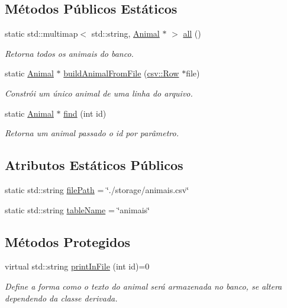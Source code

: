 \subsection*{Métodos Públicos Estáticos}
\begin{DoxyCompactItemize}
\item 
static std\+::multimap$<$ std\+::string, \hyperlink{classAnimal}{Animal} $\ast$ $>$ \hyperlink{classAnimal_a342dd3f74afeeadd169e792db6f04845}{all} ()
\begin{DoxyCompactList}\small\item\em Retorna todos os animais do banco. \end{DoxyCompactList}\item 
static \hyperlink{classAnimal}{Animal} $\ast$ \hyperlink{classAnimal_a8b0e3217c72fa8de0316828c6385dd99}{build\+Animal\+From\+File} (\hyperlink{classcsv_1_1Row}{csv\+::\+Row} $\ast$file)
\begin{DoxyCompactList}\small\item\em Constrói um único animal de uma linha do arquivo. \end{DoxyCompactList}\item 
static \hyperlink{classAnimal}{Animal} $\ast$ \hyperlink{classAnimal_aac52a938d9c55280467c9f6e9564df95}{find} (int id)
\begin{DoxyCompactList}\small\item\em Retorna um animal passado o id por parâmetro. \end{DoxyCompactList}\end{DoxyCompactItemize}
\subsection*{Atributos Estáticos Públicos}
\begin{DoxyCompactItemize}
\item 
static std\+::string \hyperlink{classAnimal_a1e487e8b5e047f764f192a423e4d21ae}{file\+Path} = \char`\"{}./storage/animais.\+csv\char`\"{}
\item 
static std\+::string \hyperlink{classAnimal_a09d2d66762ed1fea5c6858d092b6ccb9}{table\+Name} = \char`\"{}animais\char`\"{}
\end{DoxyCompactItemize}
\subsection*{Métodos Protegidos}
\begin{DoxyCompactItemize}
\item 
virtual std\+::string \hyperlink{classAnimal_ac75406040726a6339932d70164cc7242}{print\+In\+File} (int id)=0
\begin{DoxyCompactList}\small\item\em Define a forma como o texto do animal será armazenada no banco, se altera dependendo da classe derivada. \end{DoxyCompactList}\end{DoxyCompactItemize}
